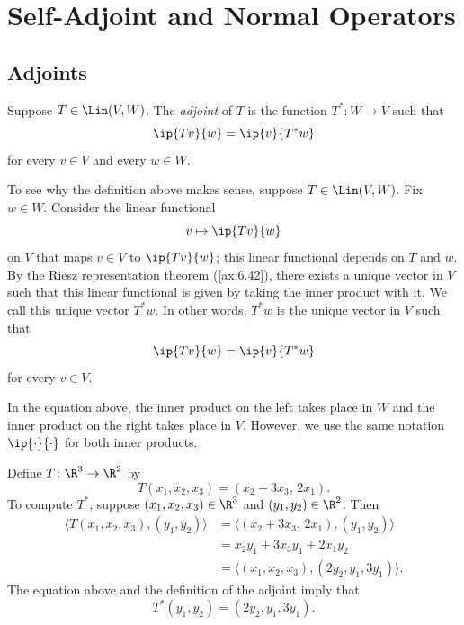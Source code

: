 \DeclareRobustCommand\axeqstep[1]{\refstepcounter{theorem}\label{#1}}
\section{Self-Adjoint and Normal Operators}

\subsection{Adjoints}

\begin{definition}[Adjoint, $T^*$]\label{ax:7.1}
Suppose $T\in\Lin(V,W)$. The \emph{adjoint} of $T$ is the function
$T^*\colon W\to V$ such that
\[ \ip{Tv}{w} = \ip{v}{T^*w} \]
for every $v\in V$ and every $w\in W$.
\end{definition}

%
To see why the definition above makes sense, suppose $T\in\Lin(V,W)$. Fix
$w\in W$. Consider the linear functional
\[ v\mapsto\ip{Tv}{w} \]
on $V$ that maps $v\in V$ to $\ip{Tv}{w}$; this linear functional depends on $T$
and $w$. By the Riesz representation theorem (\ref{ax:6.42}), there exists a
unique vector in $V$ such that this linear functional is given by taking the
inner product with it. We call this unique vector $T^*w$. In other words, $T^*w$
is the unique vector in $V$ such that
\[ \ip{Tv}{w} = \ip{v}{T^*w} \]
for every $v\in V$.

In the equation above, the inner product on the left takes place in $W$ and the
inner product on the right takes place in $V$. However, we use the same
notation $\ip{\cdot}{\cdot}$ for both inner products.

\begin{example}\label{ax:7.2}
Define $T\colon\R^3\to\R^2$ by
\[ T(x_1,x_2,x_3) = (x_2+3x_3,\,2x_1). \]
To compute $T^*$, suppose $(x_1,x_2,x_3)\in\R^3$ and $(y_1,y_2)\in\R^2$. Then
\begin{align*}
\bigl\langle T(x_1,x_2,x_3),(y_1,y_2)\bigr\rangle
  &= \bigl\langle (x_2+3x_3,\,2x_1),(y_1,y_2)\bigr\rangle\\
  &= x_2y_1+3x_3y_1+2x_1y_2\\
  &= \bigl\langle (x_1,x_2,x_3),(2y_2,y_1,3y_1)\bigr\rangle.
\end{align*}
The equation above and the definition of the adjoint imply that
\[ T^*(y_1,y_2) = (2y_2,y_1,3y_1). \]
\end{example}

